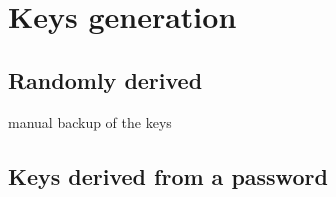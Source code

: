 \section{Keys generation}
\subsection{Randomly derived}
  manual backup of the keys
\subsection{Keys derived from a password}


